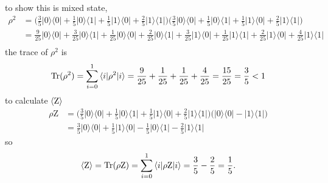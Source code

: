 \documentclass{article}
\newcommand{\op}[2]{|#1\rangle \langle#2|}
\newcommand{\sand}[3]{\braket{#1 | #2 | #3}}
\begin{document}
to show this is mixed state,
\begin{align*}
   \rho^2 &= \big(\frac{3}{5}\op{0}{0} + \frac{1}{5}\op{0}{1} + \frac{1}{5}\op{1}{0} + \frac{2}{5}\op{1}{1}\big)\big(\frac{3}{5}\op{0}{0} + \frac{1}{5}\op{0}{1} + \frac{1}{5}\op{1}{0} + \frac{2}{5}\op{1}{1}\big) \\
   &= \frac{9}{25}\op{0}{0} + \frac{3}{25}\op{0}{1} + \frac{1}{25}\op{0}{0} + \frac{2}{25}\op{0}{1} + \frac{3}{25}\op{1}{0} + \frac{1}{25}\op{1}{1} + \frac{2}{25}\op{1}{0} + \frac{4}{25}\op{1}{1} \\
\end{align*}
the trace of $\rho^2$ is
\begin{equation*}
   \text{Tr}(\rho^2) = \sum_{i=0}^{1} \sand{i}{\rho^2}{i} = \frac{9}{25} + \frac{1}{25} + \frac{1}{25} + \frac{4}{25} = \frac{15}{25} = \frac{3}{5} < 1
\end{equation*}
to calculate $\braket{\text{Z}}$
\begin{align*}
   \rho \text{Z} &= \big(\frac{3}{5}\op{0}{0} + \frac{1}{5}\op{0}{1} + \frac{1}{5}\op{1}{0} + \frac{2}{5}\op{1}{1}\big)\big(\op{0}{0}-\op{1}{1}\big) \\
   &= \frac{3}{5}\op{0}{0} + \frac{1}{5}\op{1}{0}  - \frac{1}{5}\op{0}{1} - \frac{2}{5}\op{1}{1}
\end{align*}
so
\begin{align*}
   \braket{\text{Z}} = \text{Tr}(\rho \text{Z}) = \sum_{i=0}^{1} \sand{i}{\rho \text{Z}}{i} = \frac{3}{5} - \frac{2}{5} = \frac{1}{5}.
\end{align*}
\end{document}
